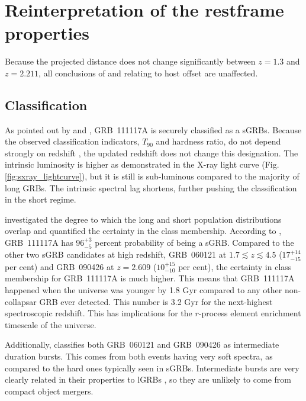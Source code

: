 \documentclass{aa}    %
\begin{document}
\section{Reinterpretation of the restframe properties}

Because the projected distance does not change significantly between $z = 1.3$ and $z =
2.211$, all conclusions of \citet{Margutti2012} and \citet{Sakamoto2013}
relating to host offset are unaffected.

\subsection{Classification}

As pointed out by \citet{Margutti2012} and \citet{Sakamoto2013}, GRB~111117A is
securely classified as a sGRBs. Because the observed classification indicators,
$T_{90}$ and hardness ratio, do not depend strongly on redshift
\citep{Littlejohns2013a}, the updated redshift does not change this designation.
The intrinsic luminosity is higher as demonstrated in the X-ray light curve
(Fig. \ref{fig:sxray_lightcurve}), but it is still is sub-luminous compared to
the majority of long GRBs. The intrinsic spectral lag shortens, further pushing
the classification in the short regime.

\citet{Bromberg2013} investigated the degree to which the long and short
population distributions overlap and quantified the certainty in the class
membership. According to \citet{Bromberg2013}, GRB~111117A has $96_{-5}^{+3}$
percent probability of being a sGRB. Compared to the other two sGRB candidates
at high redshift, GRB~060121 \citep{DeUgartePostigo2006, Levan2006} at $1.7
\lesssim z \lesssim 4.5$ ($17_{-15}^{+14}$ per cent) and GRB~090426
\citep{Antonelli2009, Levesque2010, Thone2011} at $z = 2.609$ ($10_{-10}^{+15}$
per cent), the certainty in class membership for GRB~111117A is much higher.
This means that GRB~111117A happened when the universe was younger by 1.8 Gyr
compared to any other non-collapsar GRB ever detected. This number is 3.2 Gyr
for the next-highest spectroscopic redshift. This has implications for the
$r$-process element enrichment timescale of the universe.

Additionally, \citet{Horvath2010} classifies both GRB~060121 and GRB~090426 as
intermediate duration bursts. This comes from both events having very soft
spectra, as compared to the hard ones typically seen in sGRBs. Intermediate
bursts are very clearly related in their properties to lGRBs
\citep{DeUgartePostigo2011}, so they are unlikely to come from compact object
mergers.
\end{document}

